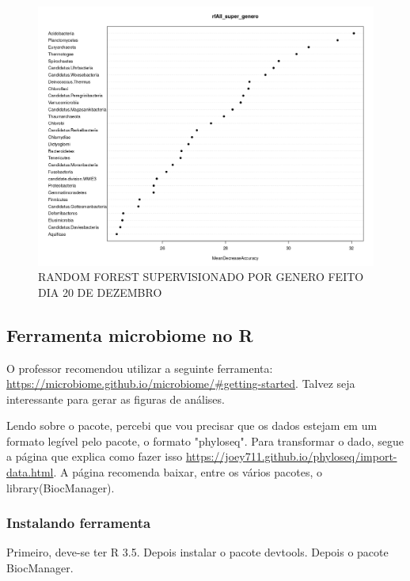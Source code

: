 \documentclass[12pt, a4paper]{report}
\begin{document}
\begin{figure}[H]
	\centering
	\includegraphics[scale=0.3]{figures/RF_super_genero_2018_12_20.png}
	\caption{RANDOM FOREST SUPERVISIONADO POR GENERO FEITO DIA 20 DE DEZEMBRO}
	\label{fig: RANDOM FOREST SUPERVISIONADO POR GENERO FEITO DIA 20 DE DEZEMBRO}
\end{figure}


\subsection{Ferramenta microbiome no R}
O professor recomendou utilizar a seguinte ferramenta: \url{https://microbiome.github.io/microbiome/#getting-started}. Talvez seja interessante para gerar as figuras de análises.

Lendo sobre o pacote, percebi que vou precisar que os dados estejam em um formato legível pelo pacote, o formato "phyloseq". Para transformar o dado, segue a página que explica como fazer isso \url{https://joey711.github.io/phyloseq/import-data.html}.
A página recomenda baixar, entre os vários pacotes, o library(BiocManager). 
\subsubsection{Instalando ferramenta}
Primeiro, deve-se ter R 3.5. Depois instalar o pacote devtools. Depois o pacote BiocManager. 


\newpage
\end{document}
